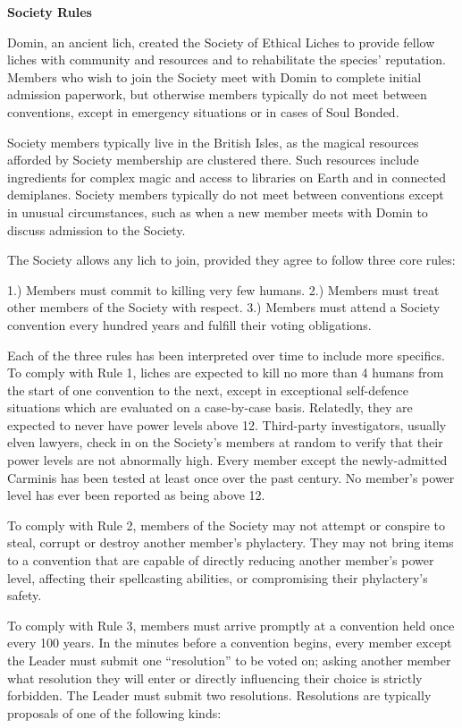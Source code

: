 \documentclass[blue]{Sel}
\begin{document}
\name{\bSociety{}}
\textbf{Society Rules}

Domin, an ancient lich, created the Society of Ethical Liches to provide fellow liches with community and resources and to rehabilitate the species’ reputation. Members who wish to join the Society meet with Domin to complete initial admission paperwork, but otherwise members typically do not meet between conventions, except in emergency situations or in cases of Soul Bonded.

Society members typically live in the British Isles, as the magical resources afforded by Society membership are clustered there. Such resources include ingredients for complex magic and access to libraries on Earth and in connected demiplanes.  Society members typically do not meet between conventions except in unusual circumstances, such as when a new member meets with Domin to discuss admission to the Society.

The Society allows any lich to join, provided they agree to follow three core rules:

1.) Members must commit to killing very few humans. 
2.) Members must treat other members of the Society with respect.
3.) Members must attend a Society convention every hundred years and fulfill their voting obligations.

Each of the three rules has been interpreted over time to include more specifics. To comply with Rule 1, liches are expected to kill no more than 4 humans from the start of one convention to the next, except in exceptional self-defence situations which are evaluated on a case-by-case basis. Relatedly, they are expected to never have power levels above 12. Third-party investigators, usually elven lawyers, check in on the Society’s members at random to verify that their power levels are not abnormally high. Every member except the newly-admitted Carminis has been tested at least once over the past century. No member’s power level has ever been reported as being above 12.

To comply with Rule 2, members of the Society may not attempt or conspire to steal, corrupt or destroy another member’s phylactery. They may not bring items to a convention that are capable of directly reducing another member’s power level, affecting their spellcasting abilities, or compromising their phylactery’s safety.

To comply with Rule 3, members must arrive promptly at a convention held once every 100 years. In the minutes before a convention begins, every member except the Leader must submit one “resolution” to be voted on; asking another member what resolution they will enter or directly influencing their choice is strictly forbidden. The Leader must submit two resolutions. Resolutions are typically proposals of one of the following kinds:
\end{document}
